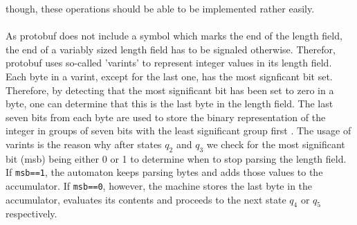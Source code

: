 though, these operations should be able to be implemented rather easily.\\\\
As protobuf does not include a symbol which marks the end of the length field, the end of a variably sized length field has to be signaled otherwise. Therefor, protobuf uses so-called 'varints' to represent integer values in its length field. Each byte in a varint, except for the last one, has the most signficant bit set. Therefore, by detecting that the most significant bit has been set to zero in a byte, one can determine that this is the last byte in the length field. The last seven bits from each byte are used to store the binary representation of the integer in groups of seven bits with the least significant group first \cite{google-protobuf-varints}. The usage of varints is the reason why after states $q_2$ and $q_3$ we check for the most significant bit (msb) being either 0 or 1 to determine when to stop parsing the length field. If \texttt{msb==1}, the automaton keeps parsing bytes and adds those values to the accumulator. If \texttt{msb==0}, however, the machine stores the last byte in the accumulator, evaluates its contents and proceeds to the next state $q_4$ or $q_5$ respectively.

